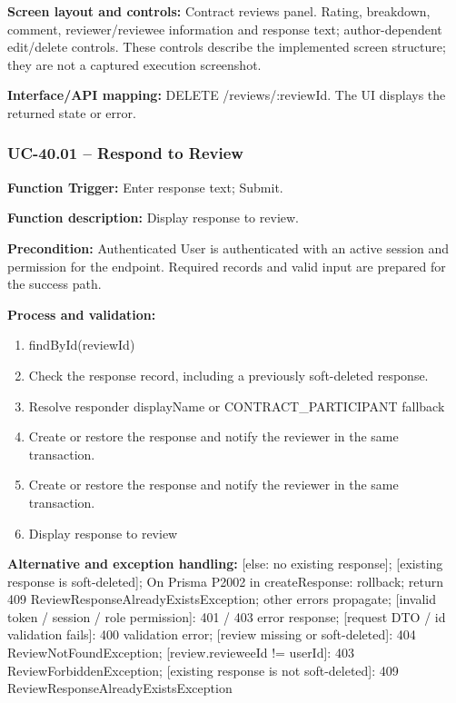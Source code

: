 \textbf{Screen layout and controls:} Contract reviews panel. Rating, breakdown, comment, reviewer/\allowbreak{}reviewee information and response text; author-dependent edit/\allowbreak{}delete controls. These controls describe the implemented screen structure; they are not a captured execution screenshot.

\textbf{Interface/\allowbreak{}API mapping:} DELETE /\allowbreak{}reviews/\allowbreak{}:review\allowbreak{}Id. The UI displays the returned state or error.

\subsubsection{UC-40.01 -- Respond to Review}
\textbf{Function Trigger:} Enter response text; Submit.

\textbf{Function description:} Display response to review.

\textbf{Precondition:} Authenticated User is authenticated with an active session and permission for the endpoint. Required records and valid input are prepared for the success path.

\textbf{Process and validation:}
\begin{enumerate}
\item find\allowbreak{}By\allowbreak{}Id(review\allowbreak{}Id)
\item Check the response record, including a previously soft-deleted response.
\item Resolve responder display\allowbreak{}Name or CONTRACT\_PARTICIPANT fallback
\item Create or restore the response and notify the reviewer in the same transaction.
\item Create or restore the response and notify the reviewer in the same transaction.
\item Display response to review
\end{enumerate}
\textbf{Alternative and exception handling:} [else: no existing response]; [existing response is soft-deleted]; On Prisma P2002 in create\allowbreak{}Response: rollback; return 409 Review\allowbreak{}Response\allowbreak{}Already\allowbreak{}Exists\allowbreak{}Exception; other errors propagate; [invalid token /\allowbreak{} session /\allowbreak{} role permission]: 401 /\allowbreak{} 403 error response; [request DTO /\allowbreak{} id validation fails]: 400 validation error; [review missing or soft-deleted]: 404 Review\allowbreak{}Not\allowbreak{}Found\allowbreak{}Exception; [review.reviewee\allowbreak{}Id !=\allowbreak{} user\allowbreak{}Id]: 403 Review\allowbreak{}Forbidden\allowbreak{}Exception; [existing response is not soft-deleted]: 409 Review\allowbreak{}Response\allowbreak{}Already\allowbreak{}Exists\allowbreak{}Exception

